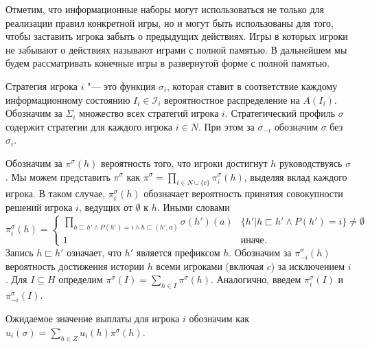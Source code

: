 \par
 Отметим, что информационные наборы могут использоваться не только для реализации правил конкретной игры, но и могут быть использованы для того, чтобы заставить игрока забыть о предыдущих действиях. Игры в которых игроки не забывают о действиях называют играми с полной памятью. В дальнейшем мы будем рассматривать конечные игры в развернутой форме с полной памятью.

Стратегия игрока $i$ "--- это функция $\sigma_i$, которая ставит в соответствие каждому информационному состоянию $I_i \in \mathcal{I}_i$ вероятностное распределение на $A(I_i)$. Обозначим за $\Sigma_i$ множество всех стратегий игрока $i$. Стратегический профиль $\sigma$ содержит стратегии для каждого игрока $i \in N$. При этом за $\sigma_{-i}$ обозначим $\sigma$ без $\sigma_i$. 

Обозначим за $\pi^\sigma(h)$ вероятность того, что игроки достигнут $h$ руководствуясь $\sigma$. Мы можем представить $\pi^\sigma$ как $\pi^\sigma = \prod_{i\in N\cup\{c\}}\pi_i^\sigma(h)$, выделяя вклад каждого игрока. В таком случае, $\pi_i^\sigma(h)$ обозначает вероятность принятия совокупности решений игрока $i$, ведущих от $\emptyset$ к $h$. Иными словами
\begin{equation*} 
\pi_i^\sigma(h)=
\begin{cases}
	\prod_{h \sqsubset h' \wedge P(h')=i \wedge h \sqsubset (h',a)} \sigma(h')(a) & \{h' | h \sqsubset h' \wedge P(h')=i \} \neq \emptyset\\
	1 &\text{иначе.}
\end{cases}
\end{equation*}
Запись $h \sqsubset h'$ означает, что $h'$ является префиксом $h$. 
Обозначим за $\pi_{-i}^\sigma(h) $ вероятность достижения истории $h$ всеми игроками (включая $c$) за исключением $i$.
Для $I \subseteq H $ определим $\pi^\sigma(I) = \sum_{h\in I}\pi^\sigma(h)$. Аналогично, введем $\pi_i^\sigma(I)$ и $\pi_{-i}^\sigma(I)$. 
\par
Ожидаемое значение выплаты для игрока $i$ обозначим как $u_i(\sigma)=\sum_{h\in Z}u_i(h)\pi^\sigma(h)$. 

